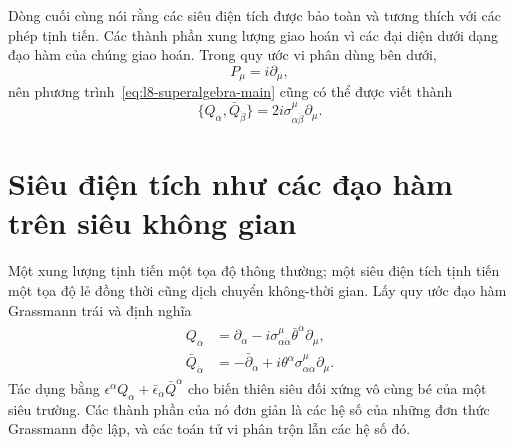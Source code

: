Dòng cuối cùng nói rằng các siêu điện tích được bảo toàn và tương thích với các phép tịnh tiến. Các thành phần xung lượng giao hoán vì các đại diện dưới dạng đạo hàm của chúng giao hoán. Trong quy ước vi phân dùng bên dưới,
\begin{equation}
P_\mu=i\partial_\mu,
\end{equation}
nên phương trình~\eqref{eq:l8-superalgebra-main} cũng có thể được viết thành
\begin{equation}
\{Q_\alpha,\bar Q_{\dot\beta}\}
=2i\sigma^\mu_{\alpha\dot\beta}\partial_\mu.
\end{equation}

\section{Siêu điện tích như các đạo hàm trên siêu không gian}

Một xung lượng tịnh tiến một tọa độ thông thường; một siêu điện tích tịnh tiến một tọa độ lẻ đồng thời cũng dịch chuyển không-thời gian. Lấy quy ước đạo hàm Grassmann trái và định nghĩa
\begin{align}
Q_\alpha
&=\partial_\alpha
-i\sigma^\mu_{\alpha\dot\alpha}
\bar\theta^{\dot\alpha}\partial_\mu,
\label{eq:l8-Q}\\
\bar Q_{\dot\alpha}
&=-\bar\partial_{\dot\alpha}
+i\theta^\alpha\sigma^\mu_{\alpha\dot\alpha}\partial_\mu.
\label{eq:l8-Qbar}
\end{align}
Tác dụng bằng \(\epsilon^\alpha Q_\alpha+
\bar\epsilon_{\dot\alpha}\bar Q^{\dot\alpha}\) cho biến thiên siêu đối xứng vô cùng bé của một siêu trường. Các thành phần của nó đơn giản là các hệ số của những đơn thức Grassmann độc lập, và các toán tử vi phân trộn lẫn các hệ số đó.

\begin{classroomqa}
\end{classroomqa}

\begin{classroomqa}
\end{classroomqa}


